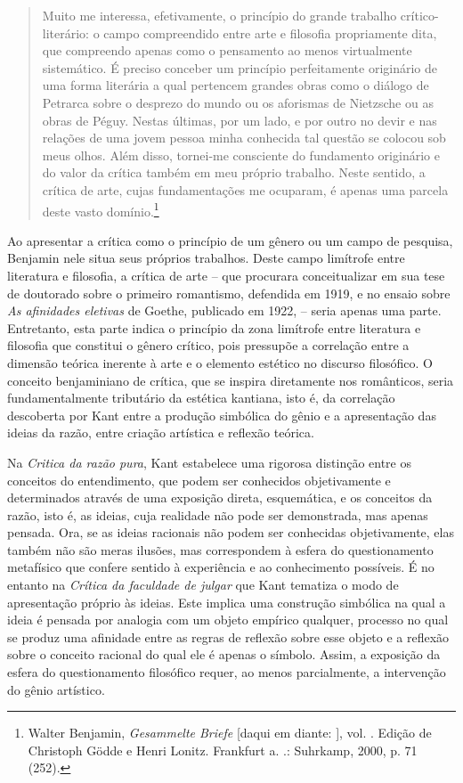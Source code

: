 \begin{quote}
Muito me interessa, efetivamente, o princípio do grande trabalho
crítico-literário: o campo compreendido entre arte e filosofia
propriamente dita, que compreendo apenas como o pensamento ao menos
virtualmente sistemático. É preciso conceber um princípio perfeitamente
originário de uma forma literária a qual pertencem grandes obras como o
diálogo de Petrarca sobre o desprezo do mundo ou os aforismas de
Nietzsche ou as obras de Péguy. Nestas últimas, por um lado, e por outro
no devir e nas relações de uma jovem pessoa minha conhecida tal questão
se colocou sob meus olhos. Além disso, tornei-me consciente do
fundamento originário e do valor da crítica também em meu próprio
trabalho. Neste sentido, a crítica de arte, cujas fundamentações me
ocuparam, é apenas uma parcela deste vasto domínio.\footnote{Walter
  Benjamin, \emph{Gesammelte Briefe} [daqui em diante: ], vol. .
  Edição de Christoph Gödde e Henri Lonitz. Frankfurt a. .: Suhrkamp,
  2000, p. 71 (252).}
\end{quote}

Ao apresentar a crítica como o princípio de um gênero ou um campo de
pesquisa, Benjamin nele situa seus próprios trabalhos. Deste campo
limítrofe entre literatura e filosofia, a crítica de arte -- que
procurara conceitualizar em sua tese de doutorado sobre o primeiro
romantismo, defendida em 1919, e no ensaio sobre \emph{As afinidades
eletivas} de Goethe, publicado em 1922, -- seria apenas uma parte.
Entretanto, esta parte indica o princípio da zona limítrofe entre
literatura e filosofia que constitui o gênero crítico, pois pressupõe a
correlação entre a dimensão teórica inerente à arte e o elemento
estético no discurso filosófico. O conceito benjaminiano de crítica, que
se inspira diretamente nos românticos, seria fundamentalmente tributário
da estética kantiana, isto é, da correlação descoberta por Kant entre a
produção simbólica do gênio e a apresentação das ideias da razão, entre
criação artística e reflexão teórica.

Na \emph{Critica da razão pura}, Kant estabelece uma rigorosa distinção
entre os conceitos do entendimento, que podem ser conhecidos
objetivamente e determinados através de uma exposição direta,
esquemática, e os conceitos da razão, isto é, as ideias, cuja realidade
não pode ser demonstrada, mas apenas pensada. Ora, se as ideias
racionais não podem ser conhecidas objetivamente, elas também não são
meras ilusões, mas correspondem à esfera do questionamento metafísico
que confere sentido à experiência e ao conhecimento possíveis. É no
entanto na \emph{Crítica da faculdade de julgar} que Kant tematiza o
modo de apresentação próprio às ideias. Este implica uma construção
simbólica na qual a ideia é pensada por analogia com um objeto empírico
qualquer, processo no qual se produz uma afinidade entre as regras de
reflexão sobre esse objeto e a reflexão sobre o conceito racional do
qual ele é apenas o símbolo. Assim, a exposição da esfera do
questionamento filosófico requer, ao menos parcialmente, a intervenção
do gênio artístico.


